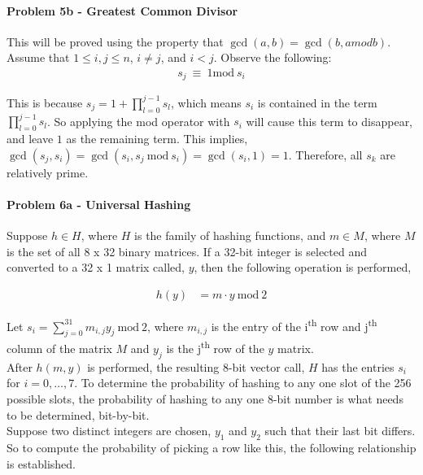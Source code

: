 \documentclass[fleqn]{article}
\begin{document}
\paragraph{Problem 5b - Greatest Common Divisor}
This will be proved using the property that $\gcd(a,b) = \gcd(b, a mod b)$.\\

Assume that $1 \le i,j \le n$, $i \neq j$, and $i < j$.  Observe the following: \\
\begin{align*}
s_j\ \equiv\ 1 \textrm{mod}\ s_i
\end{align*}

This is because $s_j= 1 + \prod\limits_{l=0}^{j-1} s_l$, which means $s_i$ is contained in the term $\prod\limits_{l=0}^{j-1} s_l$.  So applying the mod operator with $s_i$ will cause this term to disappear, and leave $1$ as the remaining term.  This implies, $\gcd(s_j,s_i)=\gcd(s_i, s_j\ \text{mod}\ s_i)=\gcd(s_i, 1)=1$.  Therefore, all $s_k$ are relatively prime.

\pagebreak
\paragraph{Problem 6a - Universal Hashing}
Suppose $h \in H$, where $H$ is the family of hashing functions, and $m \in M$, where $M$ is the set of all 8 x 32 binary matrices.  If a 32-bit integer is selected and converted to a 32 x 1 matrix called, $y$, then the following operation is performed,

\begin{align*}
h(y) &= m \cdot y\ \textrm{mod}\ 2
\end{align*}

\noindent
Let $s_i=\sum\limits_{j=0}^{31} m_{i,j}y_{j}\ \textrm{mod}\ 2$, where $m_{i,j}$ is the entry of the i\textsuperscript{th} row and j\textsuperscript{th} column of the matrix $M$ and $y_{j}$ is the j\textsuperscript{th} row of the $y$ matrix.\\

\noindent
After $h(m, y)$ is performed, the resulting 8-bit vector call, $H$ has the entries $s_i$ for $i = 0, \ldots, 7$.  To determine the probability of hashing to any one slot of the 256 possible slots, the probability of hashing to any one 8-bit number is what needs to be determined, bit-by-bit.\\

\noindent
Suppose two distinct integers are chosen, $y_1$ and $y_2$ such that their last bit differs.  So to compute the probability of picking a row like this, the following relationship is established.\\
\end{document}
